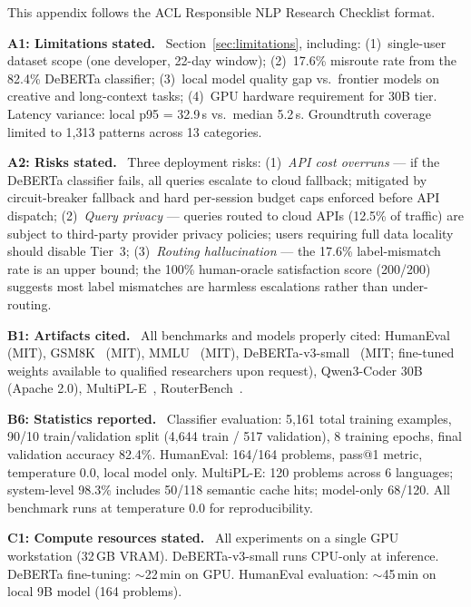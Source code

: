 \documentclass[11pt]{article}
\begin{document}
This appendix follows the ACL Responsible NLP Research Checklist format.

\textbf{A1: Limitations stated.} \checkmark~Section~\ref{sec:limitations},
including: (1)~single-user dataset scope (one developer, 22-day window);
(2)~17.6\% misroute rate from the 82.4\% DeBERTa classifier; (3)~local
model quality gap vs.\ frontier models on creative and long-context tasks;
(4)~GPU hardware requirement for 30B tier. Latency variance: local
p95 = 32.9\,s vs.\ median 5.2\,s. Groundtruth coverage limited to
1,313 patterns across 13 categories.

\textbf{A2: Risks stated.} \checkmark~Three deployment risks:
(1)~\textit{API cost overruns} --- if the DeBERTa classifier fails, all
queries escalate to cloud fallback; mitigated by circuit-breaker fallback
and hard per-session budget caps enforced before API dispatch;
(2)~\textit{Query privacy} --- queries routed to cloud APIs (12.5\% of
traffic) are subject to third-party provider privacy policies; users
requiring full data locality should disable Tier~3;
(3)~\textit{Routing hallucination} --- the 17.6\% label-mismatch rate is
an upper bound; the 100\% human-oracle satisfaction score (200/200) suggests
most label mismatches are harmless escalations rather than under-routing.

\textbf{B1: Artifacts cited.} \checkmark~All benchmarks and models
properly cited: HumanEval~\cite{chen2021humaneval} (MIT),
GSM8K~\cite{cobbe2021gsm8k} (MIT),
MMLU~\cite{hendrycks2021mmlu} (MIT),
DeBERTa-v3-small~\cite{he2021debertav3} (MIT; fine-tuned weights
available to qualified researchers upon request),
Qwen3-Coder 30B~\cite{qwen2025qwen3} (Apache 2.0),
MultiPL-E~\cite{cassano2022multipl},
RouterBench~\cite{withmartian2024routerbench}.

\textbf{B6: Statistics reported.} \checkmark~Classifier evaluation:
5,161 total training examples, 90/10 train/validation split (4,644
train / 517 validation), 8 training epochs, final validation accuracy
82.4\%. HumanEval: 164/164 problems, pass@1 metric, temperature 0.0,
local model only. MultiPL-E: 120 problems across 6 languages; system-level
98.3\% includes 50/118 semantic cache hits; model-only 68/120. All
benchmark runs at temperature 0.0 for reproducibility.

\textbf{C1: Compute resources stated.} \checkmark~All experiments on a
single GPU workstation (32\,GB VRAM). DeBERTa-v3-small runs CPU-only at
inference. DeBERTa fine-tuning: $\sim$22\,min on GPU. HumanEval
evaluation: $\sim$45\,min on local 9B model (164 problems).
\end{document}
